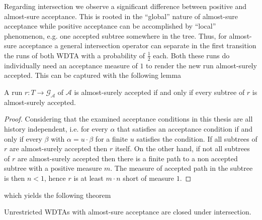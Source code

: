 Regarding intersection we observe a significant difference between positive and
almost-sure acceptance. This is rooted in the \enquote{global} nature of
almost-sure acceptance while positive acceptance can be accomplished by
\enquote{local} phenomenon, e.g. one accepted subtree somewhere in the tree.
Thus, for almost-sure acceptance a general intersection operator can separate
in the first transition the runs of both \ac{WDTA} with a probability of
$\frac{1}{2}$ each. Both these runs do individually need
an acceptance measure of $1$ to render the new run almost-surely accepted.
This can be captured with the following lemma
\begin{lemma}
  A run $r:T\rightarrow \mathcal{G}_{\mathcal{A}}$ of $\mathcal{A}$ is
  almost-surely accepted if and only if every subtree of $r$ is almost-surely
  accepted.
  \label{lem:subtreeacc}
\end{lemma}
\begin{proof}
  Considering that the examined acceptance conditions in this thesis are all
  history independent, i.e. for every $\alpha$ that satisfies an acceptance
  condition if and only if every $\beta$ with $\alpha = u\cdot\beta$ for a
  finite $u$ satisfies the condition. If all subtrees of $r$ are almost-surely
  accepted then $r$ itself. On the other hand, if not all subtrees of $r$ are
  almost-surely accepted then there is a finite path to a non accepted subtree
  with a positive measure $m$. The measure of accepted path in the subtree is
  then $n<1$, hence $r$ is at least $m\cdot n$ short of measure $1$.
\end{proof}
which yields the following theorem
\begin{proposition}
  Unrestricted \acp{WDTA} with almost-sure acceptance are closed under
  intersection.
\end{proposition}
